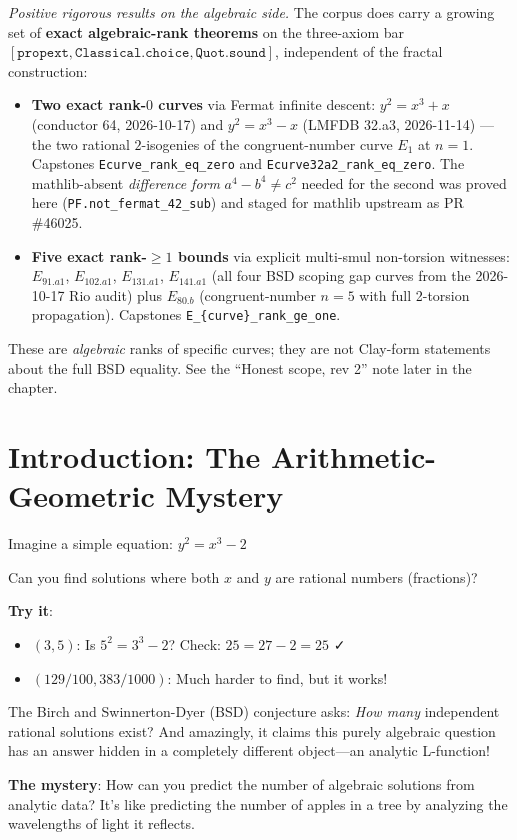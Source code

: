 \begin{chapterobjectives}
\emph{Positive rigorous results on the algebraic side.}  The corpus does carry a growing set of \textbf{exact algebraic-rank theorems} on the three-axiom bar $[\mathtt{propext}, \mathtt{Classical.choice}, \mathtt{Quot.sound}]$, independent of the fractal construction:
\begin{itemize}
\item \textbf{Two exact rank-$0$ curves} via Fermat infinite descent:
  $y^2 = x^3 + x$ (conductor 64, 2026-10-17) and $y^2 = x^3 - x$
  (LMFDB 32.a3, 2026-11-14) --- the two rational $2$-isogenies of
  the congruent-number curve $E_1$ at $n = 1$.  Capstones
  \texttt{Ecurve\_rank\_eq\_zero} and \texttt{Ecurve32a2\_rank\_eq\_zero}.
  The mathlib-absent \emph{difference form} $a^4 - b^4 \ne c^2$ needed
  for the second was proved here (\texttt{PF.not\_fermat\_42\_sub}) and
  staged for mathlib upstream as PR \#46025.
\item \textbf{Five exact rank-$\ge 1$ bounds} via explicit multi-smul
  non-torsion witnesses: $E_{91.a1}$, $E_{102.a1}$, $E_{131.a1}$,
  $E_{141.a1}$ (all four BSD scoping gap curves from the 2026-10-17
  Rio audit) plus $E_{80.b}$ (congruent-number $n = 5$ with full
  2-torsion propagation).  Capstones
  \texttt{E\_\{curve\}\_rank\_ge\_one}.
\end{itemize}
These are \emph{algebraic} ranks of specific curves; they are not Clay-form statements about the full BSD equality.  See the ``Honest scope, rev 2'' note later in the chapter.
\end{chapterobjectives}

\section{Introduction: The Arithmetic-Geometric Mystery}

\begin{intuitive}
Imagine a simple equation: $y^2 = x^3 - 2$

Can you find solutions where both $x$ and $y$ are rational numbers (fractions)?

\textbf{Try it}:
\begin{itemize}
\item $(3, 5)$: Is $5^2 = 3^3 - 2$? Check: $25 = 27 - 2 = 25$ ✓
\item $(129/100, 383/1000)$: Much harder to find, but it works!
\end{itemize}

The Birch and Swinnerton-Dyer (BSD) conjecture asks: \textit{How many} independent rational solutions exist? And amazingly, it claims this purely algebraic question has an answer hidden in a completely different object—an analytic L-function!

\textbf{The mystery}: How can you predict the number of algebraic solutions from analytic data? It's like predicting the number of apples in a tree by analyzing the wavelengths of light it reflects.
\end{intuitive}

